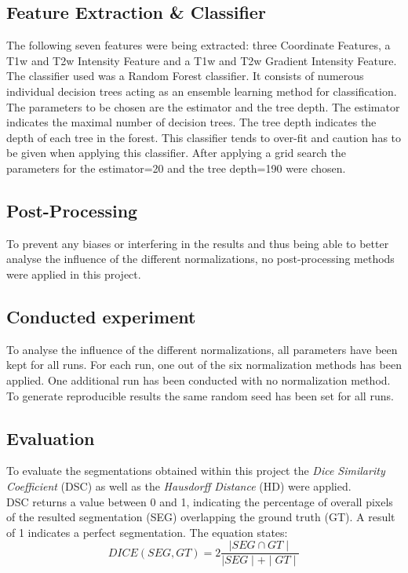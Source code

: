 \documentclass[article]{IEEEtran}
\begin{document}
\subsection{Feature Extraction \& Classifier} 
	The following seven features were being extracted: three Coordinate Features, a T1w and T2w Intensity Feature and a T1w and T2w Gradient Intensity Feature.\\
	The classifier used was a Random Forest classifier. It consists of numerous individual decision trees acting as an ensemble learning method for classification.
	The parameters to be chosen are the estimator and the tree depth. The estimator indicates the maximal number of decision trees. 
	The tree depth indicates the depth of each tree in the forest.
	This classifier tends to over-fit and caution has to be given when applying this classifier.
	After applying a grid search the parameters for the estimator=20 and the tree depth=190 were chosen. 
	
	
\subsection{Post-Processing} 
	To prevent any biases or interfering in the results and thus being able to better analyse the influence of the different normalizations, no post-processing methods were applied in this project. 
	
	
\subsection{Conducted experiment}
	To analyse the influence of the different normalizations, all parameters have been kept for all runs. 
	For each run, one out of the six normalization methods has been applied. One additional run has been conducted with no normalization method.
	To generate reproducible results the same random seed has been set for all runs.  
	
\subsection{Evaluation}
	To evaluate the segmentations obtained within this project the {\itshape Dice Similarity Coefficient} (DSC) as well as the {\itshape Hausdorff Distance} (HD) were applied.\\
	DSC returns a value between 0 and 1, indicating the percentage of overall pixels of the resulted segmentation (SEG) overlapping the ground truth (GT). 
	A result of 1 indicates a perfect segmentation. The equation states: 
	\begin{equation}
		DICE(SEG, GT) = 2 \frac{\mid SEG \cap GT \mid}{\mid SEG \mid + \mid GT \mid}
	\end{equation}
\end{document}
